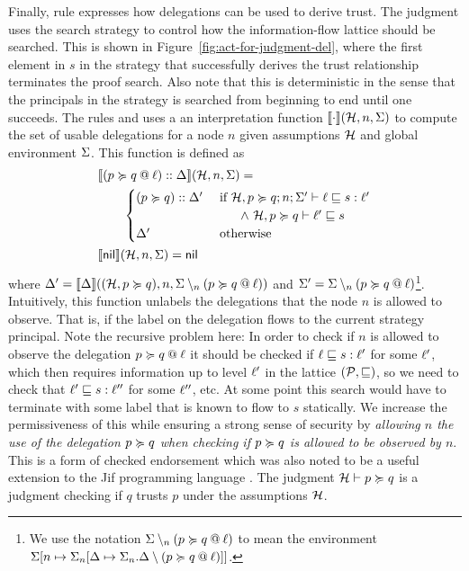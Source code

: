 Finally, rule  expresses how delegations can be used to derive trust. The judgment uses the search strategy to control how the information-flow lattice should be searched. This is shown in Figure~\ref{fig:act-for-judgment-del}, where the first element in $s$ in the strategy that successfully derives the trust relationship terminates the proof search. Also note that this is deterministic in the sense that the principals in the strategy is searched from beginning to end until one succeeds. The rules  and  uses a an interpretation function $\llbracket \cdot \rrbracket(\mathcal{H}, n, \Sigma)$ to compute the set of usable delegations for a node $n$ given assumptions $\mathcal{H}$ and global environment $\Sigma$. This function is defined as
\begin{align}\label{eq:interpret-del}
&\llbracket (\lb{\level}{p \actsfor q}) :: \scope \rrbracket(\Assumps, n, \env) = \\ \nonumber &\qquad  \begin{cases}
(p \actsfor q) :: \scope' & \text{ if } \flowstoquery{\Assumps, p \actsfor q; n; \env'}{\level}{s}{\level'} \\ &\qquad \wedge\ \nopostflowstoquery{\Assumps, p \actsfor q}{\level'}{s} \\
\scope' & \text{ otherwise}
\end{cases}
\\ \nonumber
&\llbracket \nil \rrbracket(\Assumps, n, \env) = \nil
\end{align}
where $\Delta' = \llbracket \Delta \rrbracket((\mathcal{H}, p \succcurlyeq q), n, \Sigma \setminus_n (p \succcurlyeq q \mathbin{@} \ell))$ and $\Sigma' = \Sigma \setminus_n (p \succcurlyeq q \mathbin{@} \ell)$\footnote{We use the notation $\Sigma \setminus_n (p \succcurlyeq q \mathbin{@} \ell)$ to mean the environment $\Sigma \lbrack n \mapsto \Sigma_n \lbrack \Delta \mapsto \Sigma_n.\Delta \setminus (p \succcurlyeq q \mathbin{@} \ell) \rbrack \rbrack$.}. Intuitively, this function unlabels the delegations that the node $n$ is allowed to observe. That is, if the label on the delegation flows to the current strategy principal. Note the recursive problem here: In order to check if $n$ is allowed to observe the delegation $p \succcurlyeq q \mathbin{@} \ell$ it should be checked if $\ell \sqsubseteq s : \ell'$ for some $\ell'$, which then requires information up to level $\ell'$ in the lattice $(\mathcal{P}, \sqsubseteq)$, so we need to check that $\ell' \sqsubseteq s : \ell''$ for some $\ell''$, etc. At some point this search would have to terminate with some label that is known to flow to $s$ statically. We increase the permissiveness of this while ensuring a strong sense of security by \emph{allowing $n$ the use of the delegation $p \succcurlyeq q$ when checking if $p \succcurlyeq q$ is allowed to be observed by $n$}. This is a form of checked endorsement \cite{Cite Aslan's and Myers' ATTACKER CONTROL AND IMPACT FOR CONFIDENTIALITY AND INTEGRITY paper} which was also noted to be a useful extension to the Jif programming language \cite{Cite Stephen's Secure web applications via automatic partitioning}. The judgment $\mathcal{H} \vdash p \succcurlyeq q$ is a judgment checking if $q$ trusts $p$ under the assumptions $\mathcal{H}$. 

